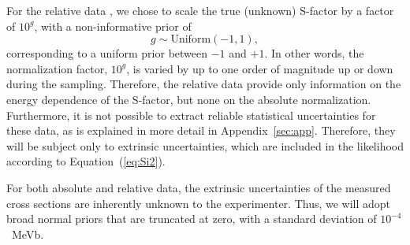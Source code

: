 \documentclass[twocolumn]{aastex63}
\begin{document}
For the relative data \citep{Gri55,Gri62,Gri63,Bai70}, we chose to scale the true (unknown) S-factor by a factor of $10^g$, with a non-informative prior of
%
\begin{equation}
\label{eq:reldata}
 g \sim \mathrm{Uniform}(-1,1),
\end{equation}
%
corresponding to a uniform prior between $-1$ and $+1$. In other words, the normalization factor, $10^g$, is varied by up to one order of magnitude up or down during the sampling. Therefore, the relative data provide only information on the energy dependence of the S-factor, but none on the absolute normalization. Furthermore, it is not possible to extract reliable statistical uncertainties for these data, as is explained in more detail in Appendix~\ref{sec:app}. Therefore, they will be subject only to extrinsic uncertainties, which are included in the likelihood according to Equation~(\ref{eq:Si2}).
 
For both absolute and relative data, the extrinsic uncertainties of the measured cross sections are inherently unknown to the experimenter. Thus, we will adopt broad normal priors that are truncated at zero, with a standard deviation of $10^{-4}$~MeVb. 
 
\end{document}
